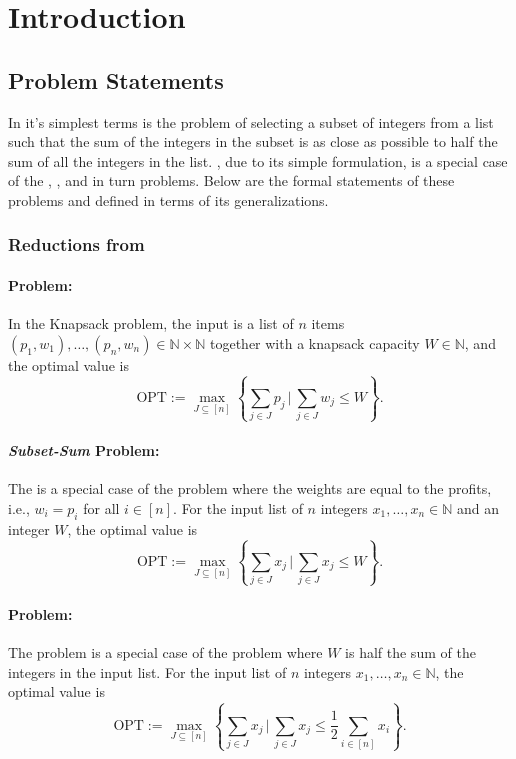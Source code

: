 \section{Introduction}
\subsection{Problem Statements}
In it's simplest terms \Partition is the problem of selecting a subset of integers from a list such that the sum of the integers in the subset is as close as possible to half the sum of all the integers in the list. \Partition, due to its simple formulation, is a special case of the \MultPart, \SubsetSum, and in turn \Knapsack problems. 
Below are the formal statements of these problems and \Partition defined in terms of its generalizations.

\subsubsection{Reductions from \Knapsack}

\paragraph{\Knapsack Problem:}
In the Knapsack problem, the input is a list of \(n\) items \\ \((p_1, w_1), \ldots, (p_n, w_n) \in \mathbb{N} \times \mathbb{N}\) together with a knapsack capacity \(W \in \mathbb{N}\), and the optimal value is
\[
    \text{OPT} := \max_{J \subseteq [n]} \left\{ \sum_{j \in J} p_j \, \bigg| \, \sum_{j \in J} w_j \leq W \right\}.
\]

\paragraph{\textit{Subset-Sum} Problem:}
The \SubsetSum is a special case of the \Knapsack problem where the weights are equal to the profits, i.e., \(w_i = p_i\) for all \(i \in [n]\). For the input list of \(n\) integers \(x_1, \ldots, x_n \in \mathbb{N}\) and an integer \(W\), the optimal value is
\[
    \text{OPT} := \max_{J \subseteq [n]} \left\{ \sum_{j \in J} x_j \, \bigg| \, \sum_{j \in J} x_j \leq W \right\}.
\]

\paragraph{\Partition Problem:}
The \Partition problem is a special case of the \SubsetSum problem where \(W\) is half the sum of the integers in the input list. For the input list of \(n\) integers \(x_1, \ldots, x_n \in \mathbb{N}\), the optimal value is
\[
    \text{OPT} := \max_{J \subseteq [n]} \left\{ \sum_{j \in J} x_j \, \bigg| \, \sum_{j \in J} x_j \leq \frac{1}{2} \sum_{i \in [n]} x_i \right\}.
\]

